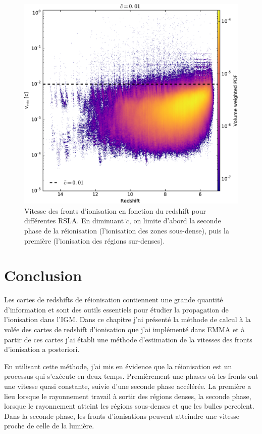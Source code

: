 \begin{figure}
        \includegraphics[height=0.3\textheight]{img/04_mapreio/speedreio_z_c001.pdf} 
        \caption[Évolution de la vitesse des fronts - histogrammes]{Vitesse des fronts d'ionisation en fonction du redshift pour différentes \ac{RSLA}.
        En diminuant $\tilde{c}$, on limite d'abord la seconde phase de la réionisation (l'ionisation des zones sous-dense), puis la première (l'ionisation des régions sur-denses).
 		\label{fig:vreioz} }
\end{figure}




\clearpage
\section{Conclusion}

Les cartes de redshifts de réionisation contiennent une grande quantité d'information et sont des outils essentiels pour étudier la propagation de l'ionisation dans l'\ac{IGM}.
Dans ce chapitre j'ai présenté la méthode de calcul à la volée des cartes de redshift d'ionisation que j'ai implémenté dans EMMA et à partir de ces cartes j'ai établi une méthode d’estimation de la vitesses des fronts d'ionisation a posteriori.

En utilisant cette méthode, j'ai mis en évidence que la réionisation est un processus qui s’exécute en deux temps.
Premièrement une phases où les fronts ont une vitesse quasi constante, suivie d'une seconde phase accélérée.
La première a lieu lorsque le rayonnement travail à sortir des régions denses, la seconde phase, lorsque le rayonnement atteint les régions sous-denses et que les bulles percolent.
Dans la seconde phase, les fronts d'ionisations peuvent atteindre une vitesse proche de celle de la lumière.

